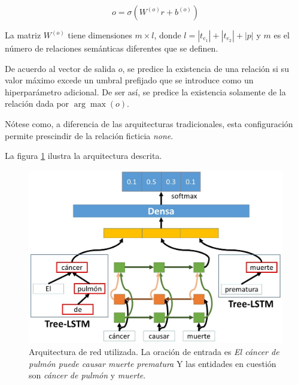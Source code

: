 \begin{equation*}
	o = \sigma(W^{(o)}r + b^{(o)})
\end{equation*}

La matriz $W^{(o)}$ tiene dimensiones $m \times l$, donde $l = |t_{e_1}| + |t_{e_2}| + |p|$ y $m$ es el número de relaciones semánticas diferentes que se definen.

De acuerdo al vector de salida $o$, se predice la existencia de una relación si su valor máximo excede un umbral prefijado que se introduce como un hiperparámetro adicional. De ser así, se predice la existencia solamente de la relación dada por $\arg\max(o)$.
	
Nótese como, a diferencia de las arquitecturas tradicionales, esta configuración permite prescindir de la relación ficticia \textit{none}.

La figura \ref{fig:rel_model} ilustra la arquitectura descrita.

\begin{figure}[h!]
	\centering
	\includegraphics[width=1\linewidth]{Graphics/rel_model_class.jpg}
	\caption{Arquitectura de red utilizada. La oración de entrada es \textit{El cáncer de pulmón puede causar muerte prematura} Y las entidades en cuestión son \textit{cáncer de pulmón} y \textit{muerte}.}\label{fig:rel_model}
\end{figure}

